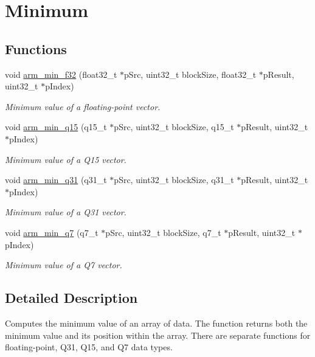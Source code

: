 \hypertarget{group___min}{\section{Minimum}
\label{group___min}
}
\subsection*{Functions}
\begin{DoxyCompactItemize}
\item 
void \hyperlink{group___min_gaf62b1673740fc516ea64daf777b7d74a}{arm\-\_\-min\-\_\-f32} (float32\-\_\-t $\ast$p\-Src, uint32\-\_\-t block\-Size, float32\-\_\-t $\ast$p\-Result, uint32\-\_\-t $\ast$p\-Index)
\begin{DoxyCompactList}\small\item\em Minimum value of a floating-\/point vector. \end{DoxyCompactList}\item 
void \hyperlink{group___min_gad065e37535ebb726750ac1545cb3fa6f}{arm\-\_\-min\-\_\-q15} (q15\-\_\-t $\ast$p\-Src, uint32\-\_\-t block\-Size, q15\-\_\-t $\ast$p\-Result, uint32\-\_\-t $\ast$p\-Index)
\begin{DoxyCompactList}\small\item\em Minimum value of a Q15 vector. \end{DoxyCompactList}\item 
void \hyperlink{group___min_gab20faeceb5ff5d2d9dd628c2ecf41303}{arm\-\_\-min\-\_\-q31} (q31\-\_\-t $\ast$p\-Src, uint32\-\_\-t block\-Size, q31\-\_\-t $\ast$p\-Result, uint32\-\_\-t $\ast$p\-Index)
\begin{DoxyCompactList}\small\item\em Minimum value of a Q31 vector. \end{DoxyCompactList}\item 
void \hyperlink{group___min_ga3631d38ac8d715fc14f6f1b343f4c4ed}{arm\-\_\-min\-\_\-q7} (q7\-\_\-t $\ast$p\-Src, uint32\-\_\-t block\-Size, q7\-\_\-t $\ast$p\-Result, uint32\-\_\-t $\ast$p\-Index)
\begin{DoxyCompactList}\small\item\em Minimum value of a Q7 vector. \end{DoxyCompactList}\end{DoxyCompactItemize}


\subsection{Detailed Description}
Computes the minimum value of an array of data. The function returns both the minimum value and its position within the array. There are separate functions for floating-\/point, Q31, Q15, and Q7 data types. 

